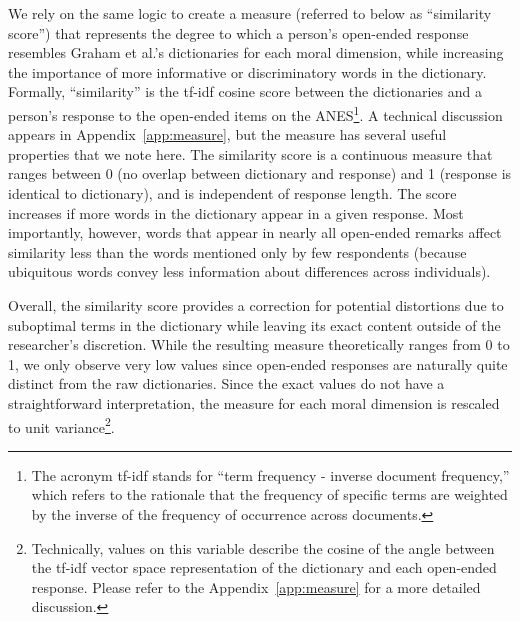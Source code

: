 \documentclass[12pt]{article}
\begin{document}
We rely on the same logic to create a measure (referred to below as ``similarity score'') that represents the degree to which a person's open-ended response resembles Graham et al.'s \citeyearpar{graham2009liberals} dictionaries for each moral dimension, while increasing the importance of more informative or discriminatory words in the dictionary. Formally, ``similarity'' is the tf-idf cosine score between the dictionaries and a person's response to the open-ended items on the ANES\footnote{The acronym tf-idf stands for ``term frequency - inverse document frequency,'' which refers to the rationale that the frequency of specific terms are weighted by the inverse of the frequency of occurrence across documents.}. A technical discussion appears in Appendix~\ref{app:measure}, but the measure has several useful properties that we note here. The similarity score is a continuous measure that ranges between 0 (no overlap between dictionary and response) and 1 (response is identical to dictionary), and is independent of response length. The score increases if more words in the dictionary appear in a given response. Most importantly, however, words that appear in nearly all open-ended remarks affect similarity less than the words mentioned only by few respondents (because ubiquitous words convey less information about differences across individuals). 

Overall, the similarity score provides a correction for potential distortions due to suboptimal terms in the dictionary while leaving its exact content outside of the researcher's discretion. While the resulting measure theoretically ranges from 0 to 1, we only observe very low values since open-ended responses are naturally quite distinct from the raw dictionaries. Since the exact values do not have a straightforward interpretation, the measure for each moral dimension is rescaled to unit variance\footnote{Technically, values on this variable describe the cosine of the angle between the tf-idf vector space representation of the dictionary and each open-ended response. Please refer to the Appendix~\ref{app:measure} for a more detailed discussion.}.
\end{document}
